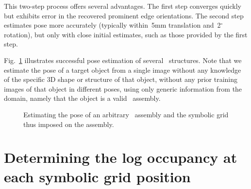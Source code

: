 This two-step process offers several advantages.
%
The first step converges quickly but exhibits error in the recovered prominent
edge orientations.
%
The second step estimates pose more accurately (typically within~5mm translation
and~2$^{\circ}$ rotation), but only with close initial estimates, such as those
provided by the first step.

Fig.~\ref{fig:pose} illustrates successful pose estimation of several
\LincolnLog\ structures.
%
Note that we estimate the pose of a target object from a single image without
any knowledge of the specific 3D shape or structure of that object, without any
prior training images of that object in different poses, using only generic
information from the domain, namely that the object is a valid \LincolnLog\
assembly.

\begin{figure}
\begin{center}
\end{center}
%
\caption{\small Estimating the pose of an arbitrary \LincolnLog\ assembly and
  the symbolic grid thus imposed on the assembly.}
%
\label{fig:pose}
\end{figure}

\section{Determining the log occupancy at each symbolic grid position}
\label{sec:occupancy}

